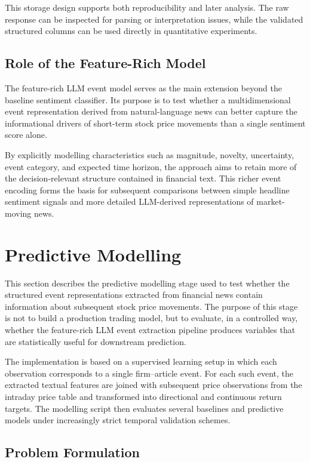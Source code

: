 This storage design supports both reproducibility and later analysis. The raw response can be inspected for parsing or interpretation issues, while the validated structured columns can be used directly in quantitative experiments.

\subsection{Role of the Feature-Rich Model}

The feature-rich LLM event model serves as the main extension beyond the baseline sentiment classifier. Its purpose is to test whether a multidimensional event representation derived from natural-language news can better capture the informational drivers of short-term stock price movements than a single sentiment score alone.

By explicitly modelling characteristics such as magnitude, novelty, uncertainty, event category, and expected time horizon, the approach aims to retain more of the decision-relevant structure contained in financial text. This richer event encoding forms the basis for subsequent comparisons between simple headline sentiment signals and more detailed LLM-derived representations of market-moving news.


\section{Predictive Modelling}

This section describes the predictive modelling stage used to test whether the structured event representations extracted from financial news contain information about subsequent stock price movements. The purpose of this stage is not to build a production trading model, but to evaluate, in a controlled way, whether the feature-rich LLM event extraction pipeline produces variables that are statistically useful for downstream prediction.

The implementation is based on a supervised learning setup in which each observation corresponds to a single firm--article event. For each such event, the extracted textual features are joined with subsequent price observations from the intraday price table and transformed into directional and continuous return targets. The modelling script then evaluates several baselines and predictive models under increasingly strict temporal validation schemes.

\subsection{Problem Formulation}

